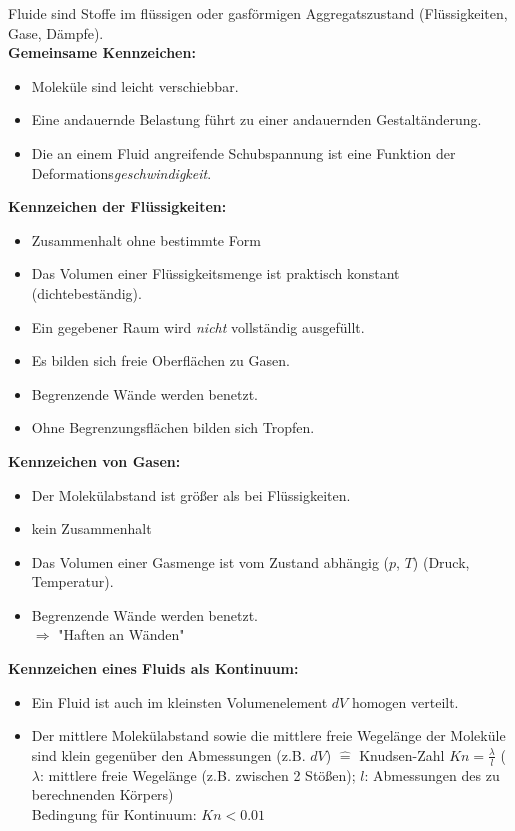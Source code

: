 \documentclass[10pt,a4paper]{article}
\begin{document}
Fluide sind Stoffe im flüssigen oder gasförmigen Aggregatszustand (Flüssigkeiten, Gase, Dämpfe). \\
\textbf{Gemeinsame Kennzeichen:}
\begin{itemize}
\item Moleküle sind leicht verschiebbar.
\item Eine andauernde Belastung führt zu einer andauernden Gestaltänderung.
\item Die an einem Fluid angreifende Schubspannung ist eine Funktion der Deformations\textit{geschwindigkeit}.
\end{itemize}
\textbf{Kennzeichen der Flüssigkeiten:}
\begin{itemize}
\item Zusammenhalt ohne bestimmte Form
\item Das Volumen einer Flüssigkeitsmenge ist praktisch konstant (dichtebeständig).
\item Ein gegebener Raum wird \textit{nicht} vollständig ausgefüllt.
\item Es bilden sich freie Oberflächen zu Gasen.
\item Begrenzende Wände werden benetzt.
\item Ohne Begrenzungsflächen bilden sich Tropfen.
\end{itemize}
\textbf{Kennzeichen von Gasen:}
\begin{itemize}
\item Der Molekülabstand ist größer als bei Flüssigkeiten.
\item kein Zusammenhalt
\item Das Volumen einer Gasmenge ist vom Zustand abhängig ($p$, $T$) (Druck, Temperatur).
\item Begrenzende Wände werden benetzt. \\
$\Rightarrow$ "Haften an Wänden"
\end{itemize}
\textbf{Kennzeichen eines Fluids als Kontinuum:}
\begin{itemize}
\item Ein Fluid ist auch im kleinsten Volumenelement $dV$ homogen verteilt.
\item Der mittlere Molekülabstand sowie die mittlere freie Wegelänge der Moleküle sind klein gegenüber den Abmessungen (z.B. $dV$) $\widehat{=}$ Knudsen-Zahl $Kn = \frac{\lambda}{l}$ ($\lambda$: mittlere freie Wegelänge (z.B. zwischen 2 Stößen); $l$: Abmessungen des zu berechnenden Körpers) \\
Bedingung für Kontinuum: $Kn < 0.01$
\end{itemize}
\end{document}
